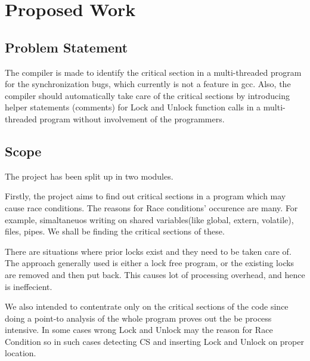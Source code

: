 \chapter{Proposed Work}

\section{Problem Statement}
The compiler is made to identify the critical section in a multi-threaded program for the synchronization bugs, which currently is not a feature in gcc. Also, the compiler should automatically take care of the critical sections by introducing helper statements (comments) for Lock and Unlock function calls in a multi-threaded program without involvement of the programmers.
\section{Scope}
The project has been split up in two modules. 

Firstly, the project aims to ﬁnd out critical sections in a program which may cause race conditions. The reasons for Race conditions’ occurence are many. For example, simaltaneuos writing on shared variables(like global, extern, volatile), ﬁles, pipes. We shall be ﬁnding the critical sections of these. 

There are situations where prior locks exist and they need to be taken care of. The approach generally used is either a lock free program, or the existing locks are removed and then put back. This causes lot of processing overhead, and hence is ineffecient. 

We also intended to contentrate only on the critical sections of the code since doing a point-to analysis of the whole program proves out the be process intensive. In some cases wrong Lock and Unlock may the reason for Race Condition so in such cases detecting CS and inserting Lock and Unlock on proper location.
